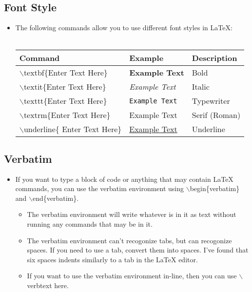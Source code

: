 \documentclass{article}
\begin{document}
		\subsection{Font Style}
			\begin{itemize}
				\item The following commands allow you to use different font styles in \LaTeX{}:\\\\
				\def\arraystretch{1.75}
				\begin{tabularx}{\textwidth}{|l|X|X|}
					\hline
					Command & Example & Description\\
					\hline
					$\backslash$textbf\{Enter Text Here\} & \textbf{Example Text} & Bold\\
					\hline
					$\backslash$textit\{Enter Text Here\} & \textit{Example Text} & Italic\\
					\hline
					$\backslash$texttt\{Enter Text Here\} & \texttt{Example Text} & Typewriter\\
					\hline
					$\backslash$textrm\{Enter Text Here\} & \textrm{Example Text} & Serif (Roman)\\
					\hline
					$\backslash$underline\{ Enter Text Here\} & \underline{Example Text} & Underline\\
					\hline
				\end{tabularx}
			\end{itemize}
		
		\subsection{Verbatim}
			\begin{itemize}
				\item If you want to type a block of code or anything that may contain \LaTeX{} commands, you can use the verbatim environment using $\backslash$begin\{verbatim\} and $\backslash$end\{verbatim\}.
				\begin{itemize}
					\item The verbatim environment will write whatever is in it as text without running any commands that may be in it.
					\item The verbatim environment can\rq{}t recogonize tabs, but can recogonize spaces. If you need to use a tab, convert them into spaces. I\rq{}ve found that six spaces indents similarly to a tab in the \LaTeX{} editor.
					\item If you want to use the verbatim environment in-line, then you can use $\backslash$verb\textbar{}text here\textbar{}.
				\end{itemize}
			\end{itemize}
\end{document}
